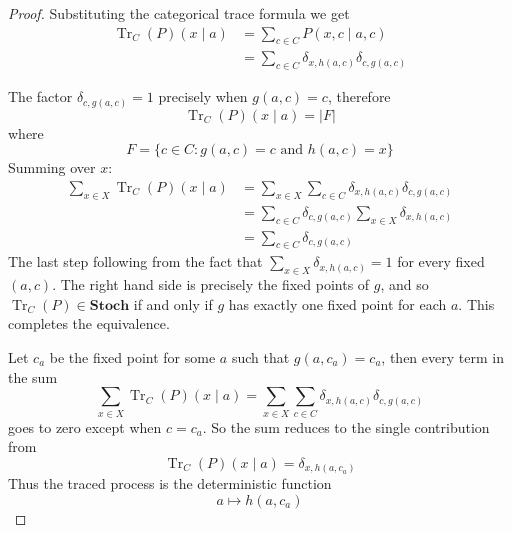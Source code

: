 \documentclass[10pt,a4paper]{amsart}
\newcommand{\Tr}[0]{\operatorname{Tr}}
\begin{document}
\begin{proof}
    Substituting the categorical trace formula we get 
    \begin{align*}
        \Tr_C(P)(x \mid a) &= \sum_{c \in C} P(x, c \mid a, c) \\
        &= \sum_{c \in C} \delta_{x, h(a, c)} \delta_{c, g(a, c)}
    \end{align*}

    The factor $\delta_{c, g(a, c)} = 1$ precisely when $g(a,c) = c$, therefore $$ \Tr_C(P)(x \mid a) = |F| $$ where $$ F = \{ c \in C : g(a,c)=c \text{ and } h(a,c) = x \}$$ Summing over $x$:
    \begin{align*}
        \sum_{x \in X} \Tr_C(P)(x\mid a) &= \sum_{x \in X} \sum_{c \in C} \delta_{x, h(a, c)} \delta_{c, g(a, c)} \\
        &= \sum_{c \in C} \delta_{c, g(a,c)} \sum_{x\in X} \delta_{x, h(a, c)} \\
        &= \sum_{c \in C} \delta_{c, g(a,c)}
    \end{align*}
    The last step following from the fact that $\sum_{x\in X} \delta_{x, h(a, c)} = 1$ for every fixed $(a,c)$. The right hand side is precisely the fixed points of $g$, and so $\Tr_C(P) \in \mathbf{Stoch}$ if and only if $g$ has exactly one fixed point for each $a$. This completes the equivalence.
    
    Let $c_a$ be the fixed point for some $a$ such that $g(a,c_a) = c_a$, then every term in the sum $$ \sum_{x \in X} \Tr_C(P)(x\mid a) = \sum_{x \in X} \sum_{c \in C} \delta_{x, h(a, c)} \delta_{c, g(a, c)} $$ goes to zero except when $c = c_a$. So the sum reduces to the single contribution from $$ \Tr_C(P)(x \mid a) = \delta_{x, h(a, c_a)} $$ Thus the traced process is the deterministic function $$ a \mapsto h(a, c_a)$$
\end{proof}
\end{document}
